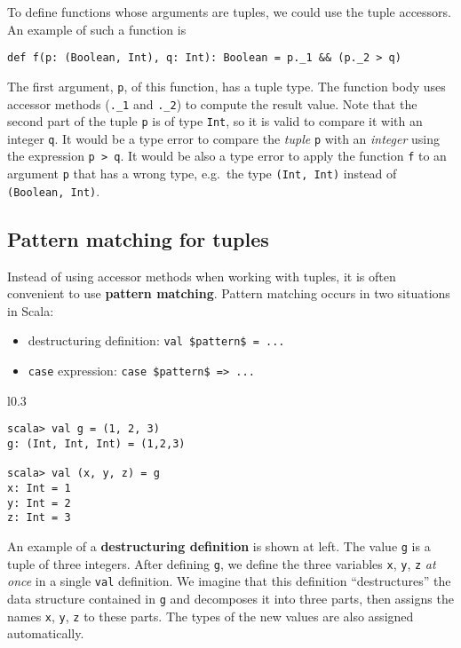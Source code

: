 To define functions whose arguments are tuples, we could use the tuple
accessors. An example of such a function is
\begin{lstlisting}
def f(p: (Boolean, Int), q: Int): Boolean = p._1 && (p._2 > q) 
\end{lstlisting}
The first argument, \lstinline!p!, of this function, has a tuple
type. The function body uses accessor methods (\lstinline!._1! and
\lstinline!._2!) to compute the result value. Note that the second
part of the tuple \lstinline!p! is of type \lstinline!Int!, so it
is valid to compare it with an integer \lstinline!q!. It would be
a type error to compare the \emph{tuple} \lstinline!p!
with an \emph{integer} using the expression \lstinline!p > q!. It
would be also a type error to apply the function \lstinline!f! to
an argument \lstinline!p! that has a wrong type, e.g.~the type \lstinline!(Int, Int)!
instead of \lstinline!(Boolean, Int)!.

\subsection{Pattern matching for tuples}

Instead of using accessor methods when working with tuples, it is
often convenient to use \textbf{pattern matching}.
Pattern matching occurs in two situations in Scala:
\begin{itemize}
\item destructuring definition: \lstinline[mathescape=true]!val $pattern$ = ...!
\item \lstinline!case! expression: \lstinline[mathescape=true]!case $pattern$ => ...!
\end{itemize}
\begin{wrapfigure}{l}{0.3\columnwidth}%
\vspace{-0.8\baselineskip}
\begin{lstlisting}
scala> val g = (1, 2, 3)
g: (Int, Int, Int) = (1,2,3)

scala> val (x, y, z) = g
x: Int = 1
y: Int = 2
z: Int = 3
\end{lstlisting}
\vspace{-1.5\baselineskip}
\end{wrapfigure}%

An example of a \textbf{destructuring definition}
is shown at left. The value \lstinline!g! is a tuple of three integers.
After defining \lstinline!g!, we define the three variables \lstinline!x!,
\lstinline!y!, \lstinline!z! \emph{at once} in a single \lstinline!val!
definition. We imagine that this definition ``destructures'' the
data structure contained in \lstinline!g! and decomposes it into
three parts, then assigns the names \lstinline!x!, \lstinline!y!,
\lstinline!z! to these parts. The types of the new values are also
assigned automatically.

